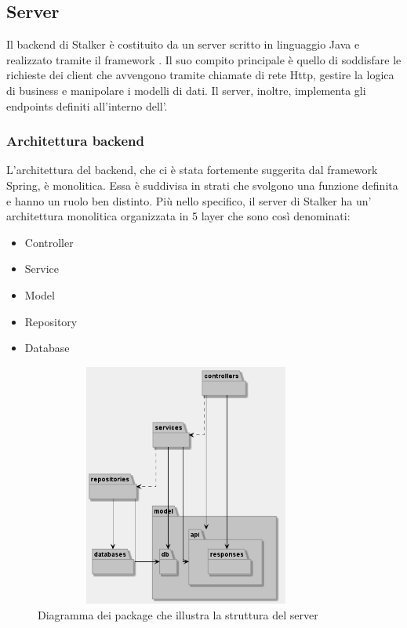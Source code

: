 \documentclass[../manuale-sviluppatore.tex]{subfiles}
\begin{document}
\subsection{Server}%
\label{sub:server}

Il backend di Stalker è costituito da un server scritto in linguaggio Java e realizzato tramite il framework .
Il suo compito principale è quello di  soddisfare le richieste dei client che avvengono tramite chiamate di rete Http, gestire la logica di business e manipolare i modelli di dati.
Il server, inoltre, implementa gli endpoints definiti all'interno dell'.

\subsubsection{Architettura backend}%
\label{architettura_backend}

L'architettura del backend, che ci è stata fortemente suggerita dal framework Spring, è monolitica.
Essa è suddivisa in strati che svolgono una funzione definita e hanno un ruolo ben distinto.
Più nello specifico, il server di Stalker ha un' architettura monolitica organizzata in 5 layer che sono così denominati:
\begin{itemize}
  \item Controller
  \item Service
  \item Model
  \item Repository
  \item Database
\end{itemize}

\begin{figure}[H]
  \centering
  \includegraphics[width=10cm, height=8cm]{img/server-package-diagram.png}
  \caption{Diagramma dei package che illustra la struttura del server}%
   \label{fig:diagramma dei package che illustra la struttura del server}
\end{figure}
\end{document}
